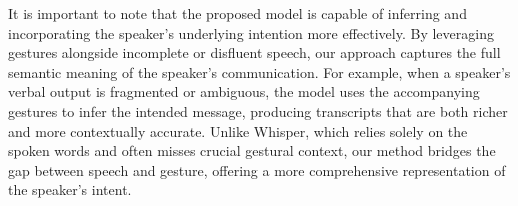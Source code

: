 It is important to note that the proposed model is capable of inferring and incorporating the speaker’s underlying intention more effectively. By leveraging gestures alongside incomplete or disfluent speech, our approach captures the full semantic meaning of the speaker’s communication. For example, when a speaker’s verbal output is fragmented or ambiguous, the model uses the accompanying gestures to infer the intended message, producing transcripts that are both richer and more contextually accurate. Unlike Whisper, which relies solely on the spoken words and often misses crucial gestural context, our method bridges the gap between speech and gesture, offering a more comprehensive representation of the speaker's intent. 
